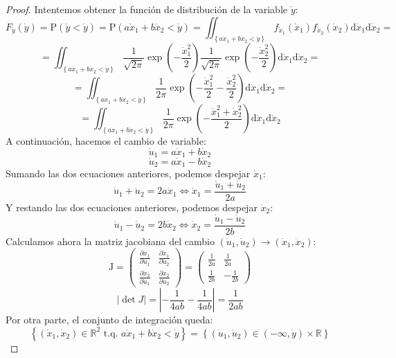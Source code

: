 \documentclass[11pt,a4paper,spanish]{article}
\numberwithin{equation}{section}
\numberwithin{table}{section}
\numberwithin{figure}{section}
\theoremstyle{definition}
\theoremstyle{remark}
\theoremstyle{definition}
\theoremstyle{remark}
\theoremstyle{plain}
\theoremstyle{plain}
\theoremstyle{plain}
\theoremstyle{plain}
\theoremstyle{plain}
\theoremstyle{plain}
\begin{document}
	\begin{proof}
		Intentemos obtener la función de distribución de la variable $\mathring{y}$:
		\[
		F_{\mathring{y}}\left(\dot{y}\right)=\mathrm{P}\left(\mathring{y}<\dot{y}\right)=\mathrm{P}\left(a\mathring{x}_{1}+b\mathring{x}_{2}<\dot{y}\right)=\iint_{\left\{ a\dot{x}_{1}+b\dot{x}_{2}<\dot{y}\right\} }f_{\mathring{x}_{1}}\left(\dot{x}_{1}\right)f_{\mathring{x}_{2}}\left(\dot{x}_{2}\right)\mathrm{d}\dot{x}_{1}\mathrm{d}\dot{x}_{2}=
		\]
		\[
		=\iint_{\left\{ a\dot{x}_{1}+b\dot{x}_{2}<\dot{y}\right\} }\frac{1}{\sqrt{2\pi}}\exp\left(-\frac{\dot{x}_{1}^{2}}{2}\right)\frac{1}{\sqrt{2\pi}}\exp\left(-\frac{\dot{x}_{2}^{2}}{2}\right)\mathrm{d}\dot{x}_{1}\mathrm{d}\dot{x}_{2}=
		\]
		\[
		=\iint_{\left\{ a\dot{x}_{1}+b\dot{x}_{2}<\dot{y}\right\} }\frac{1}{2\pi}\exp\left(-\frac{\dot{x}_{1}^{2}}{2}-\frac{\dot{x}_{2}^{2}}{2}\right)\mathrm{d}\dot{x}_{1}\mathrm{d}\dot{x}_{2}=
		\]
		\[
		=\iint_{\left\{ a\dot{x}_{1}+b\dot{x}_{2}<\dot{y}\right\} }\frac{1}{2\pi}\exp\left(-\frac{\dot{x}_{1}^{2}+\dot{x}_{2}^{2}}{2}\right)\mathrm{d}\dot{x}_{1}\mathrm{d}\dot{x}_{2}
		\]
		A continuación, hacemos el cambio de variable:
		\[
		\dot{u}_{1}=a\dot{x}_{1}+b\dot{x}_{2}
		\]
		\[
		\dot{u}_{2}=a\dot{x}_{1}-b\dot{x}_{2}
		\]
		Sumando las dos ecuaciones anteriores, podemos despejar $\dot{x}_{1}$:
		\[
		\dot{u}_{1}+\dot{u}_{2}=2a\dot{x}_{1}\iff\dot{x}_{1}=\frac{\dot{u}_{1}+\dot{u}_{2}}{2a}
		\]
		Y restando las dos ecuaciones anteriores, podemos despejar $\dot{x}_{2}$:
		\[
		\dot{u}_{1}-\dot{u}_{2}=2b\dot{x}_{2}\iff\dot{x}_{2}=\frac{\dot{u}_{1}-\dot{u}_{2}}{2b}
		\]
		Calculamos ahora la matriz jacobiana del cambio $\left(\dot{u}_{1},\dot{u}_{2}\right)\longrightarrow\left(\dot{x}_{1},\dot{x}_{2}\right)$:
		\[
		\mathrm{J}=\left(\begin{matrix}\frac{\partial\dot{x}_{1}}{\partial\dot{u}_{1}} & \frac{\partial\dot{x}_{1}}{\partial\dot{u}_{2}}\\
			\frac{\partial\dot{x}_{2}}{\partial\dot{u}_{1}} & \frac{\partial\dot{x}_{2}}{\partial\dot{u}_{2}}
		\end{matrix}\right)=\left(\begin{matrix}\frac{1}{2a} & \frac{1}{2a}\\
			\frac{1}{2b} & -\frac{1}{2b}
		\end{matrix}\right)
		\]
		\[
		\left|\det J\right|=\left|-\frac{1}{4ab}-\frac{1}{4ab}\right|=\frac{1}{2ab}
		\]
		Por otra parte, el conjunto de integración queda:
		\[
		\left\{ \left(\dot{x}_{1},\dot{x}_{2}\right)\in\mathbb{R}^{2}\text{ t.q. }a\dot{x}_{1}+b\dot{x}_{2}<\dot{y}\right\} =\left\{ \left(\dot{u}_{1},\dot{u}_{2}\right)\in(-\infty,\dot{y})\times\mathbb{R}\right\} 
\]
\end{proof}
\end{document}
